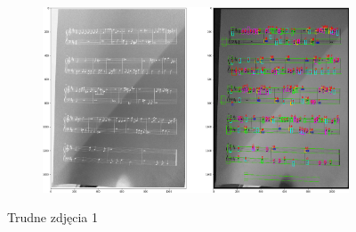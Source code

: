 \documentclass[12pt]{article}
\begin{document}
\begin{enumerate}
\begin{figure}
				\begin{subfigure}[b]{0.48\linewidth}
					\includegraphics[width=\linewidth]{Hard/Zdj9.png}
				\end{subfigure}
				\label{fig:nuuty2}
				\caption{Trudne zdjęcia 1}
			\end{figure}
		

\end{enumerate}
\end{document}
